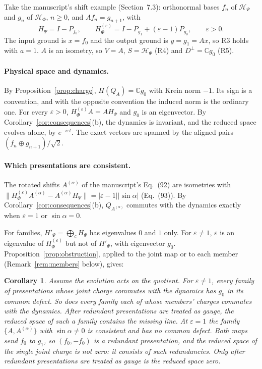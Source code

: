 \documentclass[11pt]{article}
\newtheorem{corollary}[proposition]{Corollary}
\theoremstyle{remark}
\newcommand{\C}{\mathbb C}
\newcommand{\HP}{\mathcal H_\Psi}
\newcommand{\HF}{\mathcal H_\Phi}
\begin{document}
Take the manuscript's shift example (Section~7.3): orthonormal bases $f_n$ of $\HP$ and $g_n$ of $\HF$, $n\ge0$, and $Af_n=g_{n+1}$, with
\[
 H_\Psi=I-P_{f_0},\qquad H_\Phi^{(\varepsilon)}=I-P_{g_1}+(\varepsilon-1)P_{g_0},\qquad \varepsilon>0 .
\]
The input ground is $x=f_0$ and the output ground is $y=g_1=Ax$, so R3 holds with $a=1$. $A$ is an isometry, so $V=A$, $S=\HP$ (R4) and $D^\perp=\C g_0$ (R5).

\paragraph{Physical space and dynamics.} By Proposition~\ref{prop:charge}, $H(Q_A)=\C g_0$ with Krein norm $-1$. Its sign is a convention, and with the opposite convention the induced norm is the ordinary one. For every $\varepsilon>0$, $H_\Phi^{(\varepsilon)}A=AH_\Psi$ and $g_0$ is an eigenvector. By Corollary~\ref{cor:consequences}(b), the dynamics is invariant, and the reduced space evolves alone, by $e^{-i\varepsilon t}$. The exact vectors are spanned by the aligned pairs $(f_n\oplus g_{n+1})/\sqrt2$.

\paragraph{Which presentations are consistent.} The rotated shifts $A^{(\alpha)}$ of the manuscript's Eq.~(92) are isometries with $\|H_\Phi^{(\varepsilon)}A^{(\alpha)}-A^{(\alpha)}H_\Psi\|=|\varepsilon-1||\sin\alpha|$ (Eq.~(93)). By Corollary~\ref{cor:consequences}(b), $Q_{A^{(\alpha)}}$ commutes with the dynamics exactly when $\varepsilon=1$ or $\sin\alpha=0$.

For families, $H'_\Psi=\bigoplus_cH_\Psi$ has eigenvalues $0$ and $1$ only. For $\varepsilon\ne1$, $\varepsilon$ is an eigenvalue of $H_\Phi^{(\varepsilon)}$ but not of $H'_\Psi$, with eigenvector $g_0$. Proposition~\ref{prop:obstruction}, applied to the joint map or to each member (Remark~\ref{rem:members} below), gives:

\begin{corollary}\label{cor:shift}
Assume the evolution acts on the quotient. For $\varepsilon\ne1$, every family of presentations whose joint charge commutes with the dynamics has $g_0$ in its common defect. So does every family each of whose members' charges commutes with the dynamics. After redundant presentations are treated as gauge, the reduced space of such a family contains the missing line. At $\varepsilon=1$ the family $\{A,A^{(\alpha)}\}$ with $\sin\alpha\ne0$ is consistent and has no common defect. Both maps send $f_0$ to $g_1$, so $(f_0,-f_0)$ is a redundant presentation, and the reduced space of the single joint charge is not zero: it consists of such redundancies. Only after redundant presentations are treated as gauge is the reduced space zero.
\end{corollary}
\end{document}
